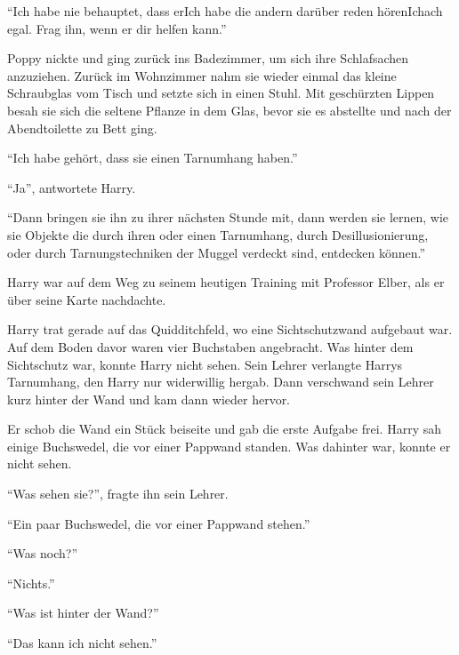 \enquote{Ich habe nie behauptet, dass er\abs Ich habe die andern darüber reden hören\abs Ich\abs ach egal. Frag ihn, wenn er dir helfen kann.}

Poppy nickte und ging zurück ins Badezimmer, um sich ihre Schlafsachen anzuziehen. Zurück im Wohnzimmer nahm sie wieder einmal das kleine Schraubglas vom Tisch und setzte sich in einen Stuhl. Mit geschürzten Lippen besah sie sich die seltene Pflanze in dem Glas, bevor sie es abstellte und nach der Abendtoilette zu Bett ging.

\trenn
\onelineback %

\begin{rueckblick}
\enquote{Ich habe gehört, dass sie einen Tarnumhang haben.}

\enquote{Ja}, antwortete Harry.

\enquote{Dann bringen sie ihn zu ihrer nächsten Stunde mit, dann werden sie lernen, wie sie Objekte die durch ihren oder einen Tarnumhang, durch Desillusionierung, oder durch Tarnungstechniken der Muggel verdeckt sind, entdecken können.}
\end{rueckblick}

Harry war auf dem Weg zu seinem heutigen Training mit Professor Elber, als er über seine Karte nachdachte. 

Harry trat gerade auf das Quidditchfeld, wo eine Sichtschutzwand aufgebaut war. Auf dem Boden davor waren vier Buchstaben angebracht.  Was hinter dem Sichtschutz war, konnte Harry nicht sehen. Sein Lehrer verlangte Harrys Tarnumhang, den Harry nur widerwillig hergab. Dann verschwand sein Lehrer kurz hinter der Wand und kam dann wieder hervor.

Er schob die Wand ein Stück beiseite und gab die erste Aufgabe frei. Harry sah einige Buchswedel, die vor einer Pappwand standen. Was dahinter war, konnte er nicht sehen.

\enquote{Was sehen sie?}, fragte ihn sein Lehrer.

\enquote{Ein paar Buchswedel, die vor einer Pappwand stehen.}

\enquote{Was noch?}

\enquote{Nichts.}

\enquote{Was ist hinter der Wand?}

\enquote{Das kann ich nicht sehen.}

